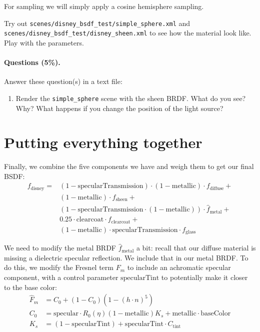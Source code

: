For sampling we will simply apply a cosine hemisphere sampling.

Try out \lstinline{scenes/disney_bsdf_test/simple_sphere.xml} and \lstinline{scenes/disney_bsdf_test/disney_sheen.xml} to see how the material look like. Play with the parameters.

\paragraph{Questions (5\%).} Answer these question(s) in a text file:
\begin{enumerate}
	\item Render the \lstinline{simple_sphere} scene with the sheen BRDF. What do you see? Why? What happens if you change the position of the light source?
\end{enumerate}

\section{Putting everything together}
Finally, we combine the five components we have and weigh them to get our final BSDF:
\begin{equation}
\begin{aligned}
f_{\text{disney}} =& (1 - \text{specularTransmission}) \cdot (1 - \text{metallic}) \cdot f_{\text{diffuse}} + \\
                   & (1 - \text{metallic}) \cdot f_{\text{sheen}} + \\
                   & (1 - \text{specularTransmission} \cdot (1 - \text{metallic})) \cdot \hat{f}_{\text{metal}} + \\
                   & 0.25 \cdot \text{clearcoat} \cdot f_{\text{clearcoat}} + \\
                   & (1 - \text{metallic}) \cdot \text{specularTransmission} \cdot f_{\text{glass}}
\end{aligned}
\label{eq:disney_bsdf}
\end{equation}

We need to modify the metal BRDF $\hat{f}_{\text{metal}}$ a bit: recall that our diffuse material is missing
a dielectric specular reflection. We include that in our metal BRDF. To do this, we modify the Fresnel term $F_m$ to include an achromatic specular component, with a control parameter $\text{specularTint}$ to potentially make it closer to the base color:
\begin{equation}
\begin{aligned}
	\hat{F}_m &= C_0 + (1 - C_0) (1 - \left(h \cdot n\right)^5) \\
	C_0 &= \text{specular} \cdot R_0(\eta) (1 - \text{metallic}) K_s + \text{metallic} \cdot \text{baseColor} \\
	K_s &= (1 - \text{specularTint}) + \text{specularTint} \cdot C_{\text{tint}}
\end{aligned}
\end{equation}

